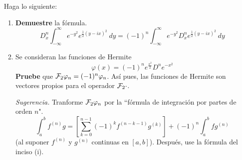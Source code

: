 \documentclass[12pt]{report}
\theoremstyle{largebreak}
\newcommand{\fou}[1]{\ensuremath{\mathcal{F}#1}}
\begin{document}
    \begin{excer}
        Haga lo siguiente:
        \begin{enumerate}
            \item \textbf{Demuestre} la fórmula.
            \begin{equation*}
                D_x^n\int_{-\infty}^\infty e^{ -y^2}e^{\frac{1}{2}(y-ix)^2}\:dy=(-1)^n\int_{-\infty}^\infty e^{ -y^2}D_x^n e^{\frac{1}{2}(y-ix)^2}\:dy
            \end{equation*}
            \item Se consideran las funciones de Hermite
            \begin{equation*}
                \varphi(x)=(-1)^n e^{\frac{x^2}{2}}D^n e^{ -x^2}
            \end{equation*}
            \textbf{Pruebe} que $\fou_2{\varphi_n}=(-1)^n\varphi_n$. Así pues, las funciones de Hermite son vectores propios para el operador $\fou_2{\cdot}$.

            \textit{Sugerencia.} Tranforme $\fou_2{\varphi_n}$ por la ``fórmula de integración por partes de orden $n$".
            \begin{equation*}
                \int_a^b f^{(n)}g=\left[\sum_{ k=0}^{ n-1}(-1)^kf^{ (n-k-1)}g^{(k)} \right]+(-1)^n\int_a^b fg^{(n)}
            \end{equation*}
            (al suponer $f^{(n)}$ y $g^{(n)}$ continuas en $[a,b]$). Después, use la fórmula del inciso (i).
        \end{enumerate}
    \end{excer}

    \begin{sol}
        
    \end{sol}
\end{document}
